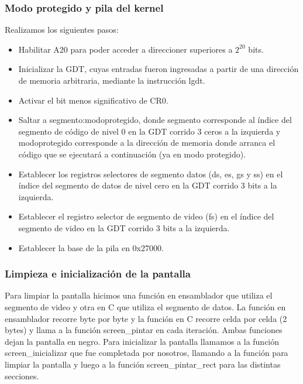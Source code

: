\subsubsection{Modo protegido y pila del kernel}
Realizamos los siguientes pasos:
\begin{itemize}
\item Habilitar A20 para poder acceder a direccioner superiores a $2^{20}$ bits.
\item Inicializar la GDT, cuyas entradas fueron ingresadas a partir de una dirección de memoria arbitraria, mediante la instrucción lgdt.
\item Activar el bit menos significativo de CR0.
\item Saltar a segmento:modoprotegido, donde segmento corresponde al índice del segmento de código de nivel 0 en la GDT corrido 3 ceros a la izquierda y modoprotegido corresponde a la dirección de memoria donde arranca el código que se ejecutará a continuación (ya en modo protegido).
\item Establecer los registros selectores de segmento datos (ds, es, gs y ss) en el índice del segmento de datos de nivel cero en la GDT corrido 3 bits a la izquierda.
\item Establecer el registro selector de segmento de video (fs) en el índice del segmento de video en la GDT corrido 3 bits a la izquierda.
\item Establecer la base de la pila en 0x27000.
\end{itemize}

\subsubsection{Limpieza e inicialización de la pantalla}
Para limpiar la pantalla hicimos una función en ensamblador que utiliza el segmento de video y otra en C que utiliza el segmento de datos. La función en ensamblador recorre byte por byte y la función en C recorre celda por celda (2 bytes) y llama a la función screen\_pintar en cada iteración. Ambas funciones dejan la pantalla en negro.\newline
Para inicializar la pantalla llamamos a la función screen\_inicializar que fue completada por nosotros, llamando a la función para limpiar la pantalla y luego a la función screen\_pintar\_rect para las distintas secciones.

